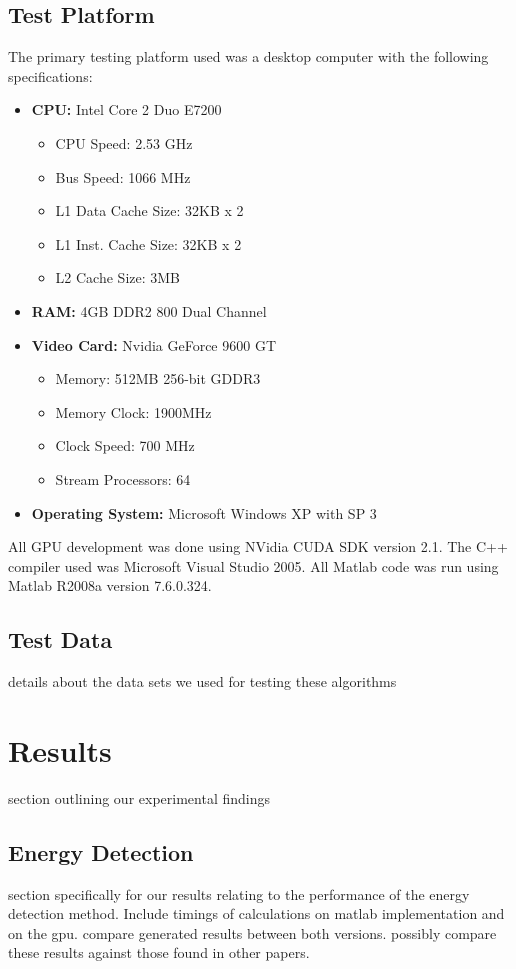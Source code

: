 \subsection{Test Platform}
\label{sect:test_platform}
The primary testing platform used was a desktop computer with the following specifications:
\begin{itemize}
\item \textbf{CPU:} Intel Core 2 Duo E7200
	\begin{itemize}
	\item CPU Speed: 2.53 GHz
	\item Bus Speed: 1066 MHz
	\item L1 Data Cache Size: 32KB x 2
	\item L1 Inst. Cache Size: 32KB x 2
	\item L2 Cache Size: 3MB
	\end{itemize}
\item \textbf{RAM:} 4GB DDR2 800 Dual Channel
\item \textbf{Video Card:} Nvidia GeForce 9600 GT
	\begin{itemize}
	\item Memory: 512MB 256-bit GDDR3
	\item Memory Clock: 1900MHz
	\item Clock Speed: 700 MHz
	\item Stream Processors: 64
	\end{itemize}
\item \textbf{Operating System:} Microsoft Windows XP with SP 3
\end{itemize}

All GPU development was done using NVidia CUDA SDK version 2.1.  The C++ compiler used was Microsoft Visual Studio 2005.  All Matlab code was run using Matlab R2008a version 7.6.0.324.

\subsection{Test Data}
details about the data sets we used for testing these algorithms



\section{Results}
section outlining our experimental findings

\subsection{Energy Detection}
\label{sect:energy_detect_result}
section specifically for our results relating to the performance of the energy detection method.  Include timings of calculations on matlab implementation and on the gpu.  compare generated results between both versions.  possibly compare these results against those found in other papers.

